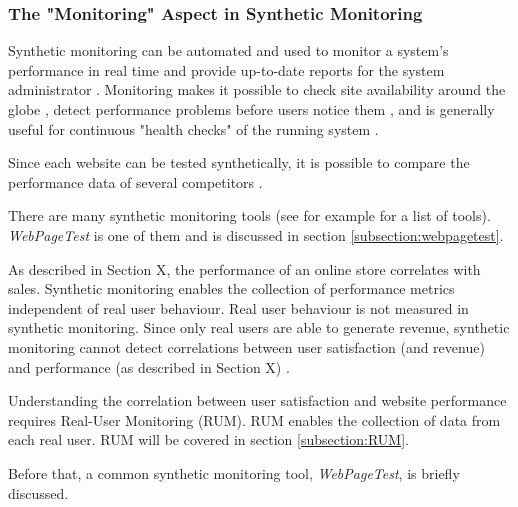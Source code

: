 \subsubsection{The "Monitoring" Aspect in Synthetic Monitoring} %

Synthetic monitoring can be automated and used to monitor a system's performance in real time and provide up-to-date reports for the system administrator \cite{2021MDNRUMvsSynthetic}.
Monitoring makes it possible to check site availability around the globe \cite{2009Croll},
detect performance problems before users notice them \cite{2013Grigorik},
and is generally useful for continuous "health checks" of the running system \cite{2021Wingerath}.

Since each website can be tested synthetically, it is possible to compare the performance data of several competitors \cite{2009Croll}.



There are many synthetic monitoring tools (see for example \cite{2016Kaur} for a list of tools). %
\textit{WebPageTest} is one of them and is discussed in section \ref{subsection:webpagetest}.



As described in Section X, the performance of an online store correlates with sales.
Synthetic monitoring enables the collection of performance metrics independent of real user behaviour.
Real user behaviour is not measured in synthetic monitoring.
Since only real users are able to generate revenue, synthetic monitoring cannot detect correlations between user satisfaction (and revenue) and performance (as described in Section X) \cite{2021Wingerath}.

Understanding the correlation between user satisfaction and website performance requires Real-User Monitoring (RUM).
RUM enables the collection of data from each real user.
RUM will be covered in section \ref{subsection:RUM}.

Before that, a common synthetic monitoring tool, \textit{WebPageTest}, is briefly discussed.





